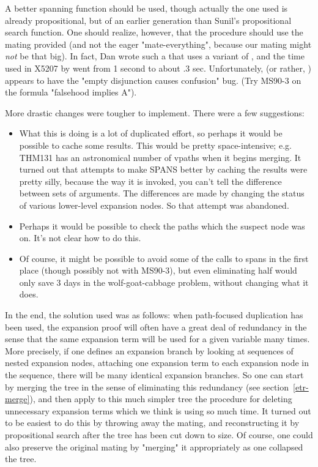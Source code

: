 A better spanning function should be used, though actually the one used
is already propositional, but of an earlier generation than Sunil's
propositional search function.  One should
realize, however, that the procedure should use the mating provided (and not 
the eager "mate-everything", because our mating might {\it not} be that big).  
In fact, Dan wrote such a  that uses a variant of ,
and the time used in X5207 by  went from 1 second to about .3 sec. 
Unfortunately,  (or rather, ) appears to 
have the "empty disjunction causes confusion" bug.  (Try MS90-3 on
the formula "falsehood implies A"). 

More drastic changes were tougher to implement. There were a few suggestions:
\begin{itemize}
\item What this is doing is a lot of duplicated effort, so perhaps it would be possible to cache some results.
This would be pretty space-intensive; e.g. THM131 has an astronomical number of vpaths
when it begins merging. It turned out that attempts to make SPANS better by caching the results were pretty silly, 
because the way it is invoked, you can't tell the difference between
sets of arguments.  The differences are made by changing the status of
various lower-level expansion nodes.  So that attempt was abandoned.

\item Perhaps it would be possible to check the paths which the suspect node was on.
It's not clear how to do this.

\item Of course, it might be possible to avoid some of the calls to spans
in the first place (though possibly not with MS90-3), but even eliminating 
half would only save 3 days in the wolf-goat-cabbage problem, without changing what it does. 
\end{itemize}

In the end, the solution used was as follows: when path-focused duplication has been
used, the expansion proof will often have a great deal of redundancy
in the sense that the same expansion term will be used for a given variable
many times. More precisely, if one defines an expansion branch by
looking at sequences of nested expansion nodes, attaching one expansion
term to each expansion node in the sequence, there will be many identical
expansion branches. So one can start by merging the tree in the
sense of eliminating this redundancy (see section~\ref{etr-merge}), and then apply to this much simpler
tree the procedure for deleting unnecessary expansion terms which
we think is using so much time. It turned out to be easiest to do this
by throwing away the mating, and reconstructing it by propositional search
after the tree has been cut down to size. Of course, one could also
preserve the original mating by "merging" it appropriately as one collapsed
the tree.

